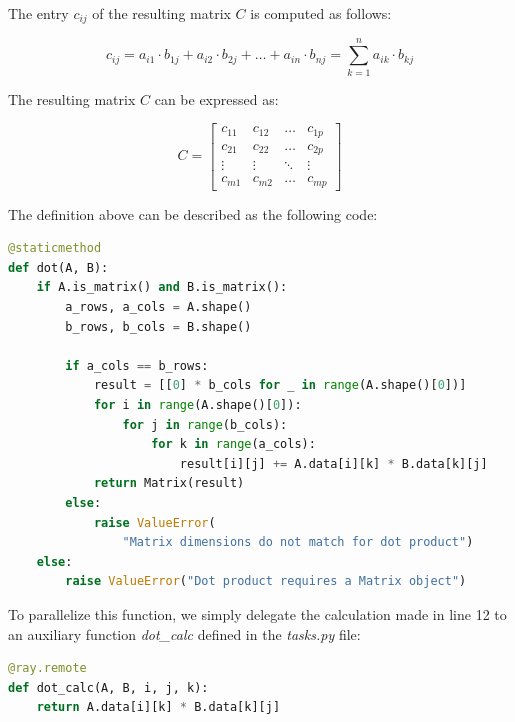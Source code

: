     The entry $c_{ij}$ of the resulting matrix $C$ is computed as follows:

    $$
        c_{ij} = a_{i1} \cdot b_{1j} + a_{i2} \cdot b_{2j} + \dots + a_{in} \cdot b_{nj} = \sum_{k=1}^{n} a_{ik} \cdot b_{kj}
    $$

    The resulting matrix $C$ can be expressed as:

    $$
        C = \begin{bmatrix}
            c_{11} & c_{12} & \dots  & c_{1p} \\
            c_{21} & c_{22} & \dots  & c_{2p} \\
            \vdots & \vdots & \ddots & \vdots \\
            c_{m1} & c_{m2} & \dots  & c_{mp}
        \end{bmatrix}
    $$

The definition above can be described as the following code:
\begin{lstlisting}[language=Python, caption={Dot function}]
@staticmethod
def dot(A, B):
    if A.is_matrix() and B.is_matrix():
        a_rows, a_cols = A.shape()
        b_rows, b_cols = B.shape()

        if a_cols == b_rows:
            result = [[0] * b_cols for _ in range(A.shape()[0])]
            for i in range(A.shape()[0]):
                for j in range(b_cols):
                    for k in range(a_cols):
                        result[i][j] += A.data[i][k] * B.data[k][j]
            return Matrix(result)
        else:
            raise ValueError(
                "Matrix dimensions do not match for dot product")
    else:
        raise ValueError("Dot product requires a Matrix object")
\end{lstlisting}
\vfill
To parallelize this function, we simply delegate the calculation made in line 12 to an auxiliary function \textit{dot\_calc} defined in the \textit{tasks.py} file:
\begin{lstlisting}[language=Python, caption={dot\_calc}]
@ray.remote
def dot_calc(A, B, i, j, k):
    return A.data[i][k] * B.data[k][j]
\end{lstlisting}


